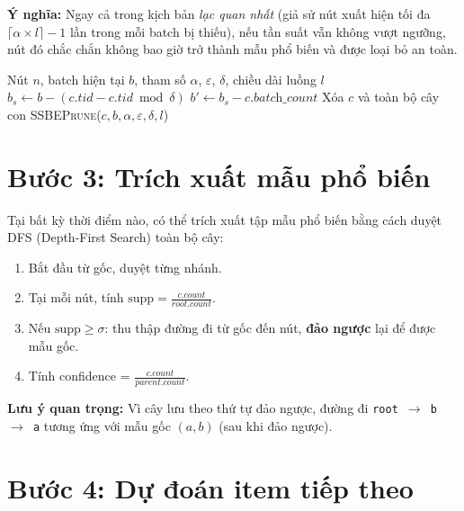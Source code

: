 \documentclass[14pt,a4paper,oneside]{extreport}
\begin{document}
\textbf{Ý nghĩa:} Ngay cả trong kịch bản \textit{lạc quan nhất} (giả sử nút xuất hiện tối đa $\lceil \alpha \times l \rceil - 1$ lần trong mỗi batch bị thiếu), nếu tần suất vẫn không vượt ngưỡng, nút đó chắc chắn không bao giờ trở thành mẫu phổ biến và được loại bỏ an toàn.

\begin{algorithm}[!ht]
\small
\caption{Cắt tỉa SSBE}
\label{alg:ssbe}
\begin{algorithmic}[1]
\REQUIRE Nút $n$, batch hiện tại $b$, tham số $\alpha$, $\varepsilon$, $\delta$, chiều dài luồng $l$
    \STATE $b_s \leftarrow b - (c.\textit{tid} - c.\textit{tid} \bmod \delta)$ 
    \STATE $b' \leftarrow b_s - c.\textit{batch\_count}$ 
        \STATE Xóa $c$ và toàn bộ cây con 
    \ELSE
        \STATE \textsc{SSBEPrune}($c, b, \alpha, \varepsilon, \delta, l$) 
    \ENDIF
\ENDFOR
\end{algorithmic}
\end{algorithm}
\vspace{-0.5em}

\section{Bước 3: Trích xuất mẫu phổ biến}

Tại bất kỳ thời điểm nào, có thể trích xuất tập mẫu phổ biến bằng cách duyệt DFS (Depth-First Search) toàn bộ cây:

\begin{enumerate}
    \item Bắt đầu từ gốc, duyệt từng nhánh.
    \item Tại mỗi nút, tính $\text{supp} = \frac{c.\textit{count}}{\textit{root}.\textit{count}}$.
    \item Nếu $\text{supp} \geq \sigma$: thu thập đường đi từ gốc đến nút, \textbf{đảo ngược} lại để được mẫu gốc.
    \item Tính confidence = $\frac{c.\textit{count}}{\textit{parent}.\textit{count}}$.
\end{enumerate}

\textbf{Lưu ý quan trọng:} Vì cây lưu theo thứ tự đảo ngược, đường đi \texttt{root $\rightarrow$ b $\rightarrow$ a} tương ứng với mẫu gốc $(a, b)$ (sau khi đảo ngược).

\section{Bước 4: Dự đoán item tiếp theo}
\end{document}
